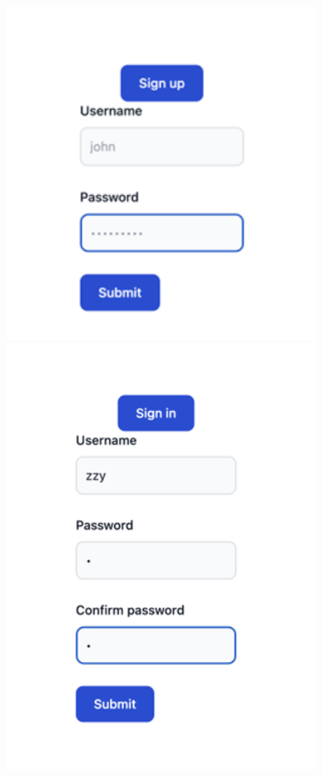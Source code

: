 \documentclass[singlecolumn]{article}
\begin{document}
\begin{figure}[H]
    \centering
    \begin{minipage}[c]{0.3\textwidth}
    \centering
    \includegraphics[width=0.9\textwidth]{sign.png}
    \end{minipage}%
    \begin{minipage}[c]{0.3\textwidth}
    \centering
    \includegraphics[width=0.9\textwidth]{sign_up.png}

\end{minipage}
\end{figure}
\end{document}
